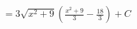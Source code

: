 \documentclass[preview]{standalone}
\begin{document}
\begin{align*}
&=3\sqrt{x^2+9}(\frac{x^2+9}{3}-\frac{18}{3})+C \\
\end{align*}
\end{document}
